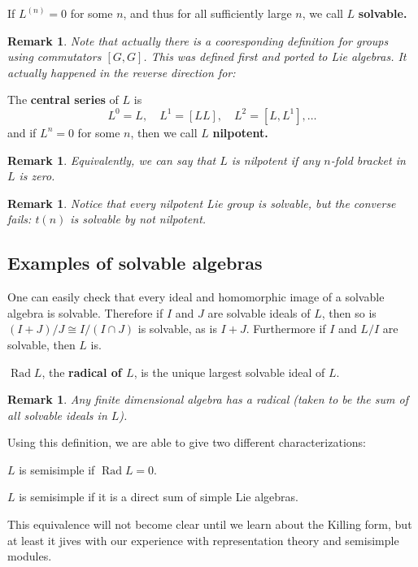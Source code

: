 \documentclass[12pt]{article}
\theoremstyle{nonumberbreak}
\theoremstyle{changebreak}
\newenvironment{defprime}[1]
  {\renewcommand{\thethm}{\ref{#1}$'$}%
   \addtocounter{thm}{-1}%
   \begin{defn}}
  {\end{defn}}
\theoremstyle{nonumberbreak}
\theoremstyle{change}
\newtheorem{rmk}[thm]{Remark}
\DeclareMathOperator{\Rad}{Rad}
\begin{document}
\begin{defn}
	If $L^{(n)}=0$ for some $n$, and thus for all sufficiently large $n$, we call $L$ \textbf{solvable.}
\end{defn}
\begin{rmk}
	Note that actually there is a cooresponding definition for groups using commutators $[G,G]$.
	This was defined first and ported to Lie algebras. It actually happened in the reverse direction for:
\end{rmk}

\begin{defn}
	The \textbf{central series} of $L$ is 
	\[L^0=L,\quad L^1=[LL],\quad L^2=[L,L^1],\dots\]
	and if $L^n=0$ for some $n$, then we call $L$ \textbf{nilpotent.}
\end{defn}
\begin{rmk}
	Equivalently, we can say that $L$ is nilpotent if \textit{any $n$-fold bracket} in $L$ is zero.
\end{rmk}
\begin{rmk}
	Notice that every nilpotent Lie group is solvable, but the converse fails: $t(n)$ is solvable by not nilpotent.
\end{rmk}

\subsection{Examples of solvable algebras}
One can easily check that every ideal and homomorphic image of a solvable algebra is solvable. Therefore if $I$ and $J$ are solvable ideals of $L$, then 
so is $(I+J)/J\cong I/(I\cap J)$ is solvable, as is $I+J$. Furthermore if $I$ and $L/I$ are solvable, then $L$ is.

\begin{defn}
	$\Rad L$, the \textbf{radical of $L$}, is the unique largest solvable ideal of $L$.
\end{defn}
\begin{rmk}
	Any finite dimensional algebra has a radical (taken to be the sum of all solvable ideals in $L$).
\end{rmk}

Using this definition, we are able to give two different characterizations:
\begin{defn}\label{def-semisimple}
	$L$ is semisimple if $\Rad L=0$.
\end{defn}
\begin{defprime}{def-semisimple}[Semisimple Lie Algebra]
	$L$ is semisimple if it is a direct sum of simple Lie algebras.
\end{defprime}
This equivalence will not become clear until we learn about the Killing form, but at least it jives
with our experience with representation theory and semisimple modules.
\end{document}
